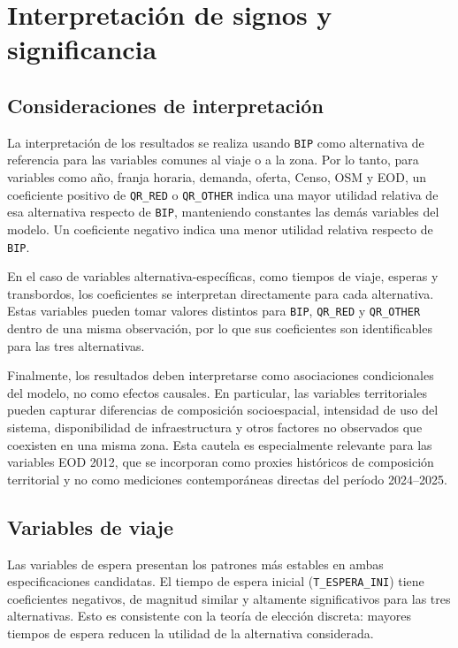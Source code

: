 \section{Interpretación de signos y significancia}

\subsection{Consideraciones de interpretación}

La interpretación de los resultados se realiza usando \texttt{BIP} como alternativa de referencia
para las variables comunes al viaje o a la zona. Por lo tanto, para variables como año, franja
horaria, demanda, oferta, Censo, OSM y EOD, un coeficiente positivo de \texttt{QR\_RED} o
\texttt{QR\_OTHER} indica una mayor utilidad relativa de esa alternativa respecto de \texttt{BIP},
manteniendo constantes las demás variables del modelo. Un coeficiente negativo indica una menor
utilidad relativa respecto de \texttt{BIP}.

En el caso de variables alternativa-específicas, como tiempos de viaje, esperas y transbordos, los
coeficientes se interpretan directamente para cada alternativa. Estas variables pueden tomar valores
distintos para \texttt{BIP}, \texttt{QR\_RED} y \texttt{QR\_OTHER} dentro de una misma observación,
por lo que sus coeficientes son identificables para las tres alternativas.

Finalmente, los resultados deben interpretarse como asociaciones condicionales del modelo, no como
efectos causales. En particular, las variables territoriales pueden capturar diferencias de
composición socioespacial, intensidad de uso del sistema, disponibilidad de infraestructura y otros
factores no observados que coexisten en una misma zona. Esta cautela es especialmente relevante para
las variables EOD 2012, que se incorporan como proxies históricos de composición territorial y no
como mediciones contemporáneas directas del período 2024--2025.

\subsection{Variables de viaje}

Las variables de espera presentan los patrones más estables en ambas especificaciones candidatas. El
tiempo de espera inicial (\texttt{T\_ESPERA\_INI}) tiene coeficientes negativos, de magnitud similar
y altamente significativos para las tres alternativas. Esto es consistente con la teoría de elección
discreta: mayores tiempos de espera reducen la utilidad de la alternativa considerada.

